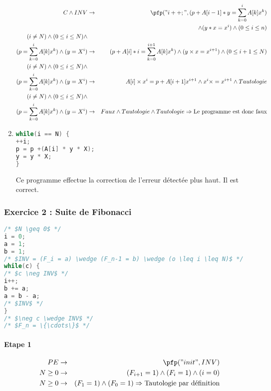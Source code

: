\begin{enumerate}
\begin{eqnarray*}
		C \wedge INV &\rightarrow& \pfp ("i++;", (p+A[i-1]*y = \sum^i_{k=0}A[k]x^k)\\&&\wedge(y*x=x^i)\wedge(0\leq i\leq n )\\
		(i \neq N) \wedge (0\leq i \leq N) \wedge\\ (p = \sum^i_{k=0} A[k] x^k) \wedge (y=X^i) &\rightarrow& (p+A[i] * i = \sum^{i+1}_{k=0}A[k]x^k) \wedge (y \times x = x^{i+1}) \wedge (0 \leq i+1 \leq N)\\
		(i \neq N) \wedge (0\leq i \leq N) \wedge \\(p = \sum^i_{k=0} A[k] x^k) \wedge (y=X^i) &\rightarrow& A[i] \times x^i = p+A[i+1]x^{i+1} \wedge x^i \times = x^{i+1} \wedge Tautologie \\
		(i \neq N) \wedge (0\leq i \leq N) \wedge \\(p = \sum^i_{k=0} A[k] x^k) \wedge (y=X^i) &\rightarrow& Faux \wedge Tautologie \wedge Tautologie\Rightarrow \textrm{Le programme est donc faux} \\
	\end{eqnarray*}
\item \begin{lstlisting}[language=C,numbers=none]
while(i == N) { 
++i;	
p = p +(A[i] * y * X); 
y = y * X; 
}
\end{lstlisting}
Ce programme effectue la correction de l'erreur détectée plus haut. Il est correct.
\end{enumerate}

\subsubsection{Exercice 2 : Suite de Fibonacci}

\begin{lstlisting}[language=C,numbers=none]
/* $N \geq 0$ */
i = 0; 
a = 1; 
b = 1;
/* $INV = (F_i = a) \wedge (F_n-1 = b) \wedge (o \leq i \leq N)$ */
while(c) {
/* $c \neg INV$ */
i++;
b += a;
a = b - a;
/* $INV$ */
}
/* $\neg c \wedge INV$ */
/* $F_n = \{\cdots\}$ */
\end{lstlisting}

\paragraph{Etape 1}
\begin{eqnarray*}
PE &\rightarrow& \pfp("init", INV)\\
N \geq 0 &\rightarrow& (F_{i+1} = 1) \wedge (F_i = 1) \wedge (i=0)\\
N \geq 0 &\rightarrow& (F_1 = 1) \wedge (F_0 = 1)\Rightarrow \textrm{Tautologie par définition}
\end{eqnarray*}
